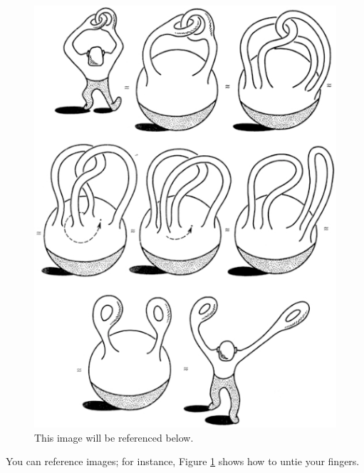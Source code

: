 \documentclass[preview]{standalone}
\begin{document}
\begin{figure}[h]
  \centering
  \includegraphics[width=0.3\linewidth]{../images/topology.png}
  \caption{This image will be referenced below.}
  \label{fig:leaf}
\end{figure}

You can reference images; for instance,
Figure \ref{fig:leaf} shows how to
untie your fingers.
\end{document}
